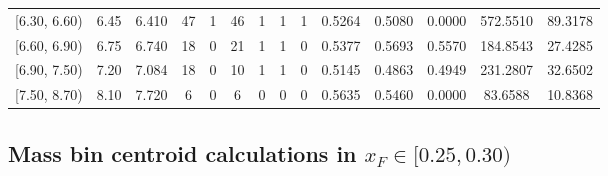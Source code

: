 \begin{table}[htbp]
{\begin{tabular}{cc|c|cccccc|ccc|cc}
        {[6.30, 6.60)} & 6.45 & 6.410 & 47 & 1 & 46 & 1 & 1 & 1 & 0.5264 & 0.5080 & 0.0000 & 572.5510 & 89.3178 \\
        {[6.60, 6.90)} & 6.75 & 6.740 & 18 & 0 & 21 & 1 & 1 & 0 & 0.5377 & 0.5693 & 0.5570 & 184.8543 & 27.4285 \\
        {[6.90, 7.50)} & 7.20 & 7.084 & 18 & 0 & 10 & 1 & 1 & 0 & 0.5145 & 0.4863 & 0.4949 & 231.2807 & 32.6502 \\
        {[7.50, 8.70)} & 8.10 & 7.720 & 6 & 0 & 6 & 0 & 0 & 0 & 0.5635 & 0.5460 & 0.0000 & 83.6588 & 10.8368 \\
        \hline\hline
    \end{tabular}
    }
\end{table}

\clearpage
\subsection{\texorpdfstring{Mass bin centroid calculations in $x_F \in [0.25, 0.30)$}{Mass bin centroid calculations in x\_F in [0.25, 0.30)]}}

